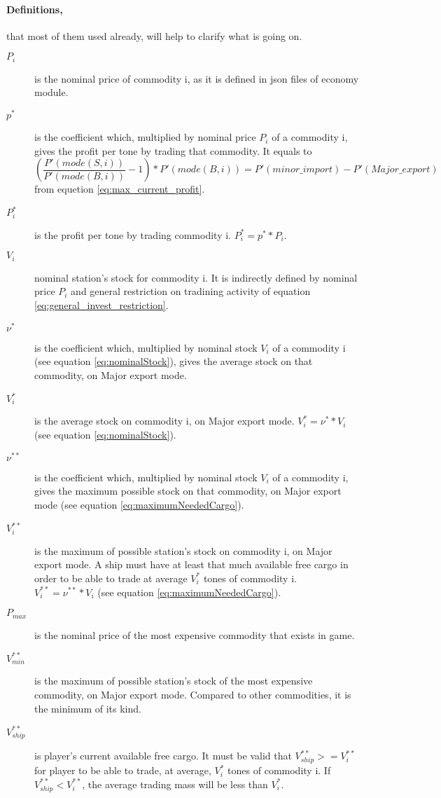 \documentclass[]{article}
\begin{document}
\paragraph{Definitions,} that most of them used already, will help to clarify what is going on.\label{sec:generalRestriction}
\begin{description}
	\item[$P_{i}$] is the nominal price of commodity i, as it is defined in json files of economy module.
	\item[$p^{*}$] is the coefficient which, multiplied by nominal price $P_{i}$ of a commodity i, gives the profit per tone by trading that commodity. It equals to \[(\dfrac{P'(mode(S,i))}{P'(mode(B,i))}-1)*P'(mode(B,i))=P'(minor\_import)-P'(Major\_export)\] from equetion \eqref{eq:max_current_profit}.
	\item[$P^{*}_{i}$] is the profit per tone by trading commodity i. $P^{*}_{i}=p^{*}*P_{i}.$
	\item[$V_{i}$] nominal station's stock for commodity i. It is indirectly defined by nominal price $P_{i}$ and general restriction on tradining activity of equation \eqref{eq:general_invest_restriction}.
	\item[$\nu^{*}$] is the coefficient which, multiplied by nominal stock $V_{i}$ of a commodity i (see equation \eqref{eq:nominalStock}), gives the average stock on that commodity, on Major export mode.
	\item[$V^{*}_{i}$] is the average stock on commodity i, on Major export mode.  $V^{*}_{i}=\nu^{*}*V_{i}$ (see equation \eqref{eq:nominalStock}).
		\item[$\nu^{**}$] is the coefficient which, multiplied by nominal stock $V_{i}$ of a commodity i, gives the maximum possible stock on that commodity, on Major export mode (see equation \eqref{eq:maximumNeededCargo}).
	\item[$V^{**}_{i}$] is the maximum of possible station's stock on commodity i, on Major export mode. A ship must have at least that much available free cargo in order to be able to trade at average $V^{*}_{i}$ tones of commodity i. $V^{**}_{i}=\nu^{**}*V_{i}$ (see equation \eqref{eq:maximumNeededCargo}).
	\item[$P_{max}$] is the nominal price of the most expensive commodity that exists in game.
	\item[$V^{**}_{min}$] is the maximum of possible station's stock of the most expensive commodity, on Major export mode. Compared to other commodities, it is the minimum of its kind.
	\item[$V^{**}_{ship}$] is player's current   available free cargo. It must be valid that $V^{**}_{ship} >= V^{**}_{i}$ for player to be able to trade, at average, $V^{*}_{i}$ tones of commodity i. If $V^{**}_{ship} < V^{**}_{i}$, the average trading mass will be less than $V^{*}_{i}.$

\end{description}
\end{document}
